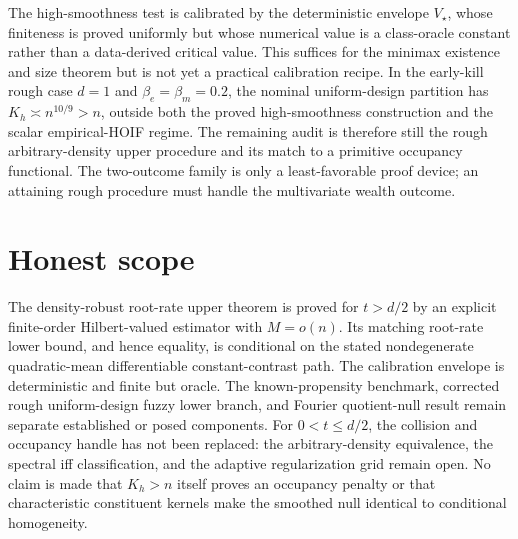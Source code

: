 \documentclass{article}
\begin{document}
The high-smoothness test is calibrated by the deterministic envelope \(V_\star\), whose finiteness is proved uniformly but whose numerical value is a class-oracle constant rather than a data-derived critical value. This suffices for the minimax existence and size theorem but is not yet a practical calibration recipe. In the early-kill rough case \(d=1\) and \(\beta_e=\beta_m=0.2\), the nominal uniform-design partition has \(K_h\asymp n^{10/9}>n\), outside both the proved high-smoothness construction and the scalar empirical-HOIF regime. The remaining audit is therefore still the rough arbitrary-density upper procedure and its match to a primitive occupancy functional. The two-outcome family is only a least-favorable proof device; an attaining rough procedure must handle the multivariate wealth outcome.

\section{Honest scope}

The density-robust root-rate upper theorem is proved for \(t>d/2\) by an explicit finite-order Hilbert-valued estimator with \(M=o(n)\). Its matching root-rate lower bound, and hence equality, is conditional on the stated nondegenerate quadratic-mean differentiable constant-contrast path. The calibration envelope is deterministic and finite but oracle. The known-propensity benchmark, corrected rough uniform-design fuzzy lower branch, and Fourier quotient-null result remain separate established or posed components. For \(0<t\le d/2\), the collision and occupancy handle has not been replaced: the arbitrary-density equivalence, the spectral iff classification, and the adaptive regularization grid remain open. No claim is made that \(K_h>n\) itself proves an occupancy penalty or that characteristic constituent kernels make the smoothed null identical to conditional homogeneity.
\end{document}

